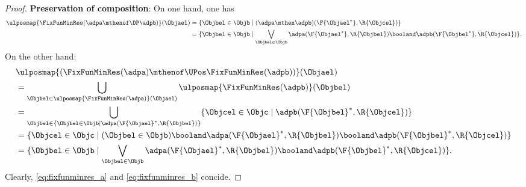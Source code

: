 \begin{proof}
    \textbf{Preservation of composition}:
    On one hand, one has
    \begin{equation}
        \label{eq:fixfunminres_a}
        \begin{aligned}
            \ulposmap{\FixFunMinRes(\adpa\mthenof\DP \adpb)}(\Objael) & =\{ \Objbel\in \Objb\mid (\adpa\mthen \adpb)(\F{\Objael^*},\R{\Objcel})\}                                                        \\
                                                                      & =\{ \Objbel\in \Objb\mid \bigvee_{\Objbel \in \Objb}\adpa(\F{\Objael^*},\R{\Objbel})\booland \adpb(\F{\Objbel^*},\R{\Objcel})\}.
        \end{aligned}
    \end{equation}
    On the other hand:
    \begin{equation}
        \label{eq:fixfunminres_b}
        \begin{aligned}
             & \ulposmap{(\FixFunMinRes(\adpa)\mthenof\UPos \FixFunMinRes(\adpb))}(\Objael)                                                                    \\
             & =\bigcup_{\Objbel \in \ulposmap{\FixFunMinRes(\adpa)}(\Objael)}\ulposmap{\FixFunMinRes(\adpb)}(\Objbel)                                         \\
             & =\bigcup_{\Objbel \in \{ \Objbel \in \Objb \mid \adpa(\F{\Objael}^*,\R{\Objbel})\}} \{\Objcel \in \Objc \mid \adpb(\F{\Objbel}^*,\R{\Objcel})\} \\
             & =\{\Objcel\in \Objc \mid (\Objbel \in \Objb)\booland \adpa(\F{\Objael}^*,\R{\Objbel})\booland \adpb(\F{\Objbel}^*,\R{\Objcel})\}                \\
             & =\{ \Objbel\in \Objb\mid \bigvee_{\Objbel \in \Objb}\adpa(\F{\Objael}^*,\R{\Objbel})\booland \adpb(\F{\Objbel}^*,\R{\Objcel})\}.
        \end{aligned}
    \end{equation}
    Clearly, \cref{eq:fixfunminres_a} and \cref{eq:fixfunminres_b} concide.
\end{proof}

